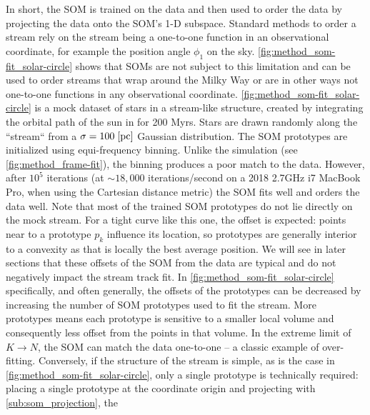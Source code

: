 \documentclass[fleqn,usenatbib]{mnras}
\begin{document}
      In short, the SOM is trained on the data and then used to order the data
      by projecting the data onto the SOM's 1-D subspace. Standard methods to
      order a stream rely on the stream being a one-to-one function in an
      observational coordinate, for example the position angle $\phi_1$ on the
      sky. \autoref{fig:method_som-fit_solar-circle} shows that SOMs are not
      subject to this limitation and can be used to order streams that wrap
      around the Milky Way or are in other ways not one-to-one functions in any
      observational coordinate. \autoref{fig:method_som-fit_solar-circle} is a
      mock dataset of stars in a stream-like structure, created by integrating
      the orbital path of the sun \citep{Reid2004, GRAVITY2018, Drimmel2018,
      Bennett2019} in \galpyMWPotential{} for 200 Myrs. Stars are drawn randomly
      along the ``stream`` from a $\sigma=100 \; [\rm{pc}]$ Gaussian
      distribution. The SOM prototypes are initialized using equi-frequency
      binning. Unlike the  simulation (see
      \autoref{fig:method_frame-fit}), the binning produces a poor match to the
      data. However, after $10^5$ iterations (at $\sim\!18,000$
      iterations/second on a 2018 2.7GHz i7 MacBook Pro, when using the
      Cartesian distance metric) the SOM fits well and orders the data well.
      Note that most of the trained SOM prototypes do not lie directly on the
      mock stream. For a tight curve like this one, the offset is expected:
      points near to a prototype $p_k$ influence its location, so prototypes are
      generally interior to a convexity as that is locally the best average
      position. We will see in later sections that these offsets of the SOM from
      the data are typical and do not negatively impact the stream track fit. In
      \autoref{fig:method_som-fit_solar-circle} specifically, and often
      generally, the offsets of the prototypes can be decreased by increasing
      the number of SOM prototypes used to fit the stream. More prototypes means
      each prototype is sensitive to a smaller local volume and consequently
      less offset from the points in that volume. In the extreme limit of $K
      \rightarrow N$, the SOM can match the data one-to-one -- a classic example
      of over-fitting. Conversely, if the structure of the stream is simple, as
      is the case in \autoref{fig:method_som-fit_solar-circle}, only a single
      prototype is technically required: placing a single prototype at the
      coordinate origin and projecting with \autoref{sub:som_projection}, the
\end{document}
